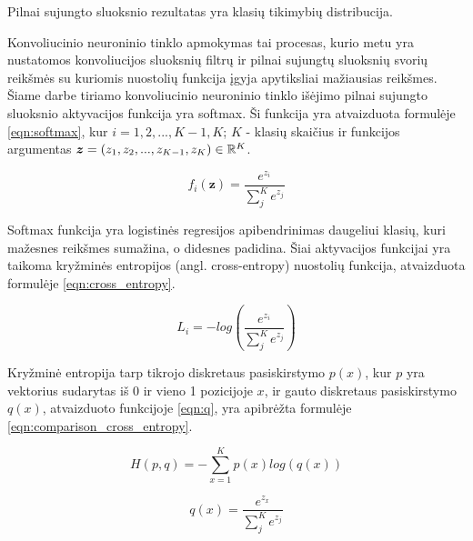 Pilnai sujungto sluoksnio rezultatas yra klasių tikimybių distribucija.

Konvoliucinio neuroninio tinklo apmokymas tai procesas, kurio metu yra nustatomos konvoliucijos sluoksnių filtrų ir pilnai sujungtų sluoksnių svorių reikšmės su kuriomis nuostolių funkcija įgyja apytiksliai mažiausias reikšmes. Šiame darbe tiriamo konvoliucinio neuroninio tinklo išėjimo pilnai sujungto sluoksnio aktyvacijos funkcija yra softmax. Ši funkcija yra atvaizduota formulėje \ref{eqn:softmax}, kur $i = 1, 2, ..., K - 1, K$; $K$ - klasių skaičius ir funkcijos argumentas $\boldsymbol{z} = (z_1, z_2, ..., z_{K - 1}, z_K) \in \mathbb{R}^K$.

\begin{equation}
\label{eqn:softmax}
	f_i(\boldsymbol{z}) = \dfrac{e^{z_i}}{\sum_{j}^{K} e^{z_j}}
\end{equation}

Softmax funkcija yra logistinės regresijos apibendrinimas daugeliui klasių, kuri mažesnes reikšmes sumažina, o didesnes padidina. Šiai aktyvacijos funkcijai yra taikoma kryžminės entropijos (angl. cross-entropy) nuostolių funkcija, atvaizduota formulėje \ref{eqn:cross_entropy}.

\begin{equation}
\label{eqn:cross_entropy}
	L_i = - log(\dfrac{e^{z_i}}{\sum_{j}^{K} e^{z_j}})
\end{equation}

Kryžminė entropija tarp tikrojo diskretaus pasiskirstymo $p(x)$, kur $p$ yra vektorius sudarytas iš 0 ir vieno 1 pozicijoje $x$, ir gauto diskretaus pasiskirstymo $q(x)$, atvaizduoto funkcijoje \ref{eqn:q}, yra apibrėžta formulėje \ref{eqn:comparison_cross_entropy}.

\begin{equation}
\label{eqn:comparison_cross_entropy}
	H(p, q) = - \sum_{x = 1}^K p(x) log(q(x))
\end{equation}

\begin{equation}
\label{eqn:q}
	q(x) = \dfrac{e^{z_x}}{\sum_{j}^{K} e^{z_j}}
\end{equation}
